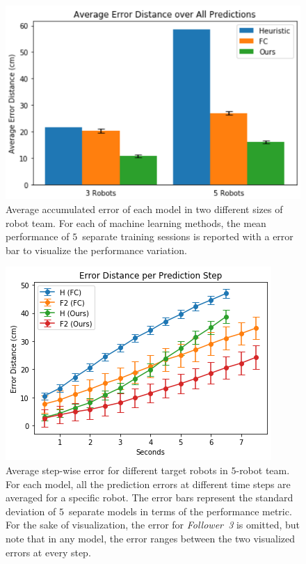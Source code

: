 \documentclass[letterpaper, 10 pt, conference]{ieeeconf}  %
\begin{document}
	

	\begin{figure}[t]
	\centering
	\includegraphics[width=1.\columnwidth]{fig_macro_eval}
	\caption{Average accumulated error of each model in two different sizes of robot team. 
		For each of machine learning methods, the mean performance of $5$~separate training 
		sessions is reported with a error bar to visualize the performance variation. 
	}
	\label{fig:macro_eval}
	\end{figure}


	\begin{figure}[t]
		\centering
		\includegraphics[width=1.\columnwidth]{fig_micro_eval}
		\caption{Average step-wise error for different target robots in $5$-robot team. 
			For each model, all the prediction errors at different time steps are averaged 
			for a specific robot. The error bars represent the standard deviation of 
			$5$~separate models in terms of the performance metric. For the sake of 
			visualization, the error for \emph{Follower~3} is omitted, but note that 
			in any model, the error ranges between the two visualized errors at every step. 
		}
		\label{fig:micro_eval}
	\end{figure}
\end{document}
